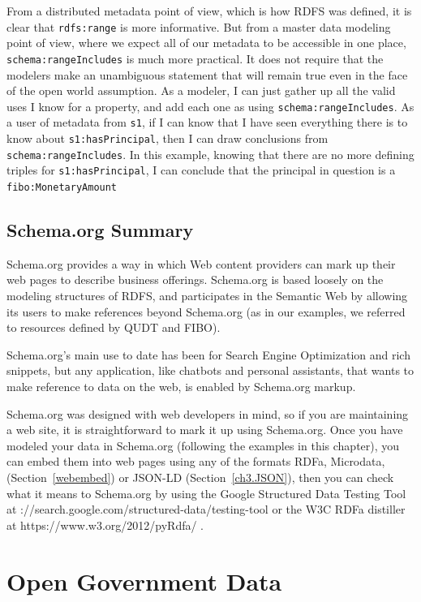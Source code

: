 From a distributed metadata point of view, which is how RDFS was defined, it is clear that \texttt{rdfs:range} is more informative.
But from a master data modeling point of view, where we expect all of our metadata to be accessible in one place, \texttt{schema:rangeIncludes} 
is much more practical.  It does not require that the modelers make an unambiguous statement that will remain true even 
in the face of the open world assumption.   As a modeler, I can just gather up all the valid uses I know for a property,
and add each one as using \texttt{schema:rangeIncludes}.  As a user of metadata from \texttt{s1}, if I can know that I have seen everything 
there is to know about \texttt{s1:hasPrincipal}, then I can draw conclusions from \texttt{schema:rangeIncludes}.  In this example,
knowing that there are no more defining triples for \texttt{s1:hasPrincipal},  I can conclude that the principal 
in question is a \texttt{fibo:MonetaryAmount}

\subsection{Schema.org Summary}

Schema.org provides a way in which Web content
providers can mark up their web pages to describe business offerings.
Schema.org is based loosely on the modeling structures of RDFS, and participates
in the Semantic Web by allowing its users to make references beyond Schema.org 
(as in our examples, we referred to resources defined by QUDT and FIBO). 

Schema.org's main use to date has been for Search Engine Optimization and 
rich snippets, but any application, like chatbots and personal assistants, that 
wants to make reference to data on the web, is enabled by Schema.org markup. 

Schema.org was designed with web developers in mind, so if you are maintaining 
a web site, it is straightforward to mark it up using Schema.org. 
Once you have modeled your data in Schema.org (following the examples
in this chapter), you can embed them into web pages
using any of the formats RDFa, Microdata, (Section~\ref{webembed}) or 
JSON-LD (Section~\ref{ch3.JSON}), then you can check what it means to Schema.org
by using the Google Structured Data Testing Tool at ://search.google.com/structured-data/testing-tool or the W3C RDFa distiller at https://www.w3.org/2012/pyRdfa/ .


\section{Open Government Data}

